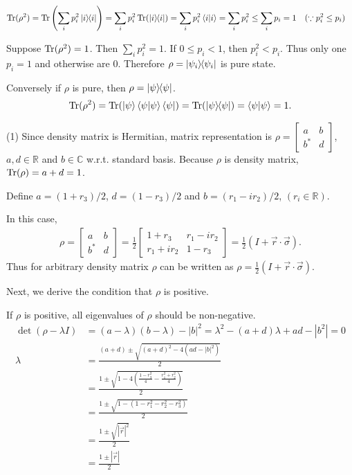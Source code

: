 \begin{align*}
    \operatorname{Tr} (\rho^2) &= \operatorname{Tr} \left(\sum_i p_i^2 \ket{i}\hspace{-1mm} \bra{i}\right)
        = \sum_i p_i^2 \operatorname{Tr}(\ket{i}\hspace{-1mm} \bra{i})
        = \sum_i p_i^2 \braket{i|i}
        = \sum_i p_i^2
        \leq \sum_i p_i = 1~~~ (\because p_i^2 \leq p_i)
\end{align*}

Suppose $\operatorname{Tr} (\rho^2) = 1$. Then $\sum_i p_i^2 = 1$.
If $0 \leq p_i < 1$, then $p_i^2 < p_i$.
Thus only one $p_i = 1$ and otherwise are $0$.
Therefore $\rho = \ket{\psi_i}\hspace{-1mm} \bra{\psi_i}$ is pure state.

Conversely if $\rho$ is pure, then $\rho = \ket{\psi}\hspace{-1mm} \bra{\psi}$.
\begin{align*}
    \operatorname{Tr} (\rho^2) = \operatorname{Tr} (\ket{\psi}\braket{\psi | \psi} \bra{\psi}) = \operatorname{Tr} (\ket{\psi}\hspace{-1mm} \bra{\psi}) = \braket{\psi | \psi} = 1.
\end{align*}




(1) Since density matrix is Hermitian, matrix representation is
$\rho = \begin{bmatrix}
    a & b \\ b^* & d
\end{bmatrix}$,
$a, d \in \mathds{R}$ and $b \in \mathds{C}$ w.r.t. standard basis.
Because $\rho$ is density matrix, $\operatorname{Tr} (\rho) = a+d = 1$.

Define $a = (1+r_3)/2$, $d = (1-r_3)/2$ and $b = (r_1 - ir_2)/2$, $(r_i \in \mathds{R})$.

In this case,
\begin{align*}
    \rho = \begin{bmatrix}
        a & b \\ b^* & d
    \end{bmatrix}
    =
    \frac{1}{2} \begin{bmatrix}
        1+r_3 & r_1 - ir_2 \\
        r_1 + ir_2 & 1 - r_3
    \end{bmatrix}
    =
    \frac{1}{2} (I + \vec{r} \cdot \vec{\sigma}).
\end{align*}
Thus for arbitrary density matrix $\rho$ can be written as $\rho = \frac{1}{2} (I + \vec{r} \cdot \vec{\sigma})$.

Next, we derive the condition that $\rho$ is positive.

If $\rho$ is positive, all eigenvalues of $\rho$ should be non-negative.
\begin{align*}
    \det (\rho - \lambda I) &= (a-  \lambda) (b - \lambda) - |b|^2 = \lambda^2 - (a+d)\lambda + ad - |b^2| = 0\\
    \lambda &= \frac{(a+d) \pm \sqrt{(a+d)^2 - 4 (ad - |b|^2)}}{2}\\
        &= \frac{1 \pm \sqrt{1 - 4 \left(\frac{1 - r_3^2}{4} - \frac{r_1^2 + r_2^2}{4} \right)}}{2}\\
        &= \frac{1 \pm \sqrt{1 - (1 - r_1^2 - r_2^2 - r_3^2)}}{2}\\
        &= \frac{1 \pm \sqrt{|\vec{r}|^2}}{2}\\
        &= \frac{1 \pm |\vec{r}|}{2}
\end{align*}

